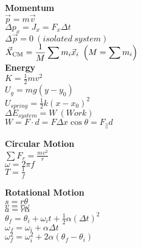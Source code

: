 \documentclass[12pt]{article}
\begin{document}
\begin{twocolumn}
\begin{flushleft}
\bigskip
{\bf Momentum }\\
\medskip
$\displaystyle \vec{p} = m \vec{v}$ \\
\medskip
$\displaystyle \Delta p_{x} = J_x = F_x \Delta t$ \\
\medskip
$\displaystyle \Delta \vec{p} = 0 \ (isolated~system)$ \\
\medskip
$\displaystyle \vec{X}_{\rm CM} = \frac{1}{M}\sum m_i\vec{x}_i \ \left(M = \sum m_i\right)$ \\


\bigskip
{\bf Energy}\\
\medskip
$\displaystyle {K} = \frac{1}{2} m v^2$ \\
\medskip
$\displaystyle U_{g} = m g (y - y_0)$ \\
\medskip
$\displaystyle U_{spring} = \frac{1}{2} k (x-x_0)^2$\\
\medskip
$\displaystyle \Delta E_{system}  = W \ (Work)$ \\

\medskip
$\displaystyle W = F \cdot d = F\Delta x \cos \theta = F_\parallel d$\\

\medskip
\medskip



{\bf Circular Motion} \\
\medskip
$\displaystyle \sum F_{r} = \frac{m v^2}{r} $\\
\medskip
$\displaystyle \omega = 2 \pi f $ \\
\medskip
$\displaystyle T = \frac{1}{f} $ \\
\medskip


{\bf Rotational Motion} \\
\medskip
$\displaystyle s = r \theta$ \\
\medskip
$\displaystyle v = r \omega$ \\
\medskip
$\displaystyle a = r \alpha $\\
\medskip
$\displaystyle \theta_f = \theta_i + \omega_{i} t + \frac{1}{2} \alpha (\Delta t)^2$ \\
\medskip
$\displaystyle \omega_{f} = \omega_{i} + \alpha \Delta t $ \\
\medskip
$\displaystyle \omega_{f}^2 = \omega_{i}^2 + 2 \alpha (\theta_f - \theta_i)$\\


\end{flushleft}
\end{twocolumn}
\end{document}
